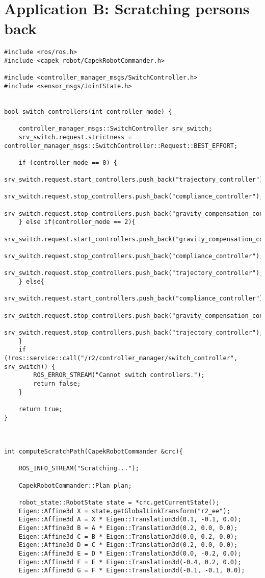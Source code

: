 \chapter{Application B: Scratching persons back}

\begin{lstlisting}
#include <ros/ros.h>
#include <capek_robot/CapekRobotCommander.h>

#include <controller_manager_msgs/SwitchController.h>
#include <sensor_msgs/JointState.h>


bool switch_controllers(int controller_mode) {

	controller_manager_msgs::SwitchController srv_switch;
	srv_switch.request.strictness = controller_manager_msgs::SwitchController::Request::BEST_EFFORT;

	if (controller_mode == 0) {
		srv_switch.request.start_controllers.push_back("trajectory_controller");
		srv_switch.request.stop_controllers.push_back("compliance_controller");
		srv_switch.request.stop_controllers.push_back("gravity_compensation_controller");
	} else if(controller_mode == 2){
		srv_switch.request.start_controllers.push_back("gravity_compensation_controller");
		srv_switch.request.stop_controllers.push_back("compliance_controller");
		srv_switch.request.stop_controllers.push_back("trajectory_controller");
	} else{
		srv_switch.request.start_controllers.push_back("compliance_controller");
		srv_switch.request.stop_controllers.push_back("gravity_compensation_controller");
		srv_switch.request.stop_controllers.push_back("trajectory_controller");
	}
	if (!ros::service::call("/r2/controller_manager/switch_controller", srv_switch)) {
		ROS_ERROR_STREAM("Cannot switch controllers.");
		return false;
	}

	return true;
}



int computeScratchPath(CapekRobotCommander &crc){

	ROS_INFO_STREAM("Scratching...");

	CapekRobotCommander::Plan plan;

	robot_state::RobotState state = *crc.getCurrentState();
	Eigen::Affine3d X = state.getGlobalLinkTransform("r2_ee");
	Eigen::Affine3d A = X * Eigen::Translation3d(0.1, -0.1, 0.0);
	Eigen::Affine3d B = A * Eigen::Translation3d(0.2, 0.0, 0.0);
	Eigen::Affine3d C = B * Eigen::Translation3d(0.0, 0.2, 0.0);
	Eigen::Affine3d D = C * Eigen::Translation3d(0.2, 0.0, 0.0);
	Eigen::Affine3d E = D * Eigen::Translation3d(0.0, -0.2, 0.0);
	Eigen::Affine3d F = E * Eigen::Translation3d(-0.4, 0.2, 0.0);
	Eigen::Affine3d G = F * Eigen::Translation3d(-0.1, -0.1, 0.0);



\end{lstlisting}

